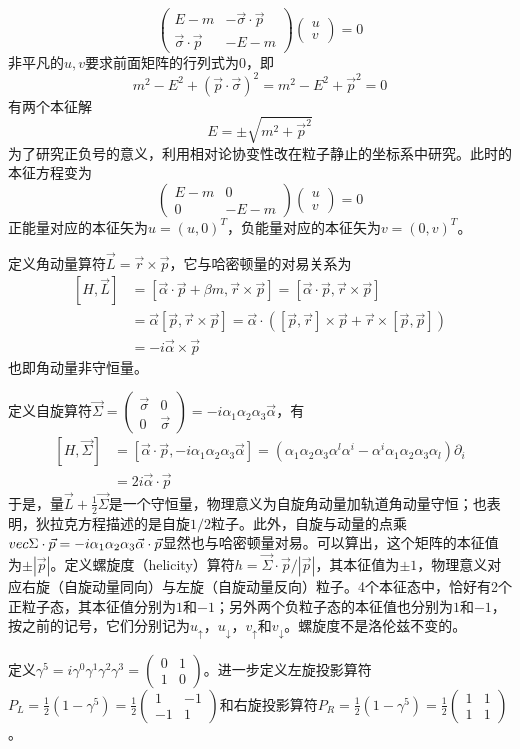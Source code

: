 \documentclass[a4paper,11pt]{ctexart}
\newcommand{\beq}{\begin{equation}}
\newcommand{\eeq}{\end{equation}}
\newcommand{\bea}{\begin{equation}\begin{aligned}}
\newcommand{\eea}{\end{aligned}\end{equation}}
\newcommand{\mt}[4]{\begin{pmatrix}#1 & #2 \\ #3 & #4 \end{pmatrix}}
\begin{document}
\beq
\begin{pmatrix}
E-m & -\vec{\sigma} \cdot \vec{p} \\
\vec{\sigma} \cdot \vec{p} & -E-m
\end{pmatrix}
\begin{pmatrix} u \\ v \end{pmatrix}
=0
\eeq
非平凡的$u,v$要求前面矩阵的行列式为0，即
\beq
m^2 - E^2 + \left( \vec{p} \cdot \vec{\sigma}\right)^2 = m^2 - E^2 + \vec{p}^2 = 0
\eeq
有两个本征解
\beq
E = \pm \sqrt{m^2 + \vec{p}^2}
\eeq
为了研究正负号的意义，利用相对论协变性改在粒子静止的坐标系中研究。此时的本征方程变为
\beq
\mt{E-m}{0}{0}{-E-m} \begin{pmatrix} u \\ v \end{pmatrix} = 0
\eeq
正能量对应的本征矢为$u = (u,0)^T$，负能量对应的本征矢为$v = (0,v)^T$。\par
定义角动量算符$\vec{L} = \vec{r} \times \vec{p}$，它与哈密顿量的对易关系为
\bea
[H,\vec{L}] &= [\vec{\alpha} \cdot \vec{p} + \beta m , \vec{r} \times \vec{p}] = [\vec{\alpha} \cdot \vec{p},\vec{r} \times \vec{p}] \\ &= \vec{\alpha} [\vec{p},\vec{r} \times \vec{p}] = \vec{\alpha} \cdot \left( [\vec{p} ,\vec{r}] \times \vec{p} + \vec{r} \times [\vec{p}, \vec{p}] \right) \\
&= -i \vec{\alpha} \times \vec{p}
\eea
也即角动量非守恒量。
\par
定义自旋算符$\vec{\Sigma} = \mt{\vec{\sigma}}{0}{0}{\vec{\sigma}} = -i \alpha_1 \alpha_2 \alpha_3 \vec{\alpha}$，有
\bea
[H,\vec{\Sigma}] &= [\vec{\alpha} \cdot \vec{p} , -i \alpha_1 \alpha_2 \alpha_3 \vec{\alpha}]  = \left( \alpha_1 \alpha_2 \alpha_3 \alpha^l \alpha^i - \alpha^i \alpha_1 \alpha_2 \alpha_3 \alpha_l \right) \partial_i \\
&=2i \vec{\alpha} \cdot \vec{p}
\eea
于是，量$\vec{L} + \frac{1}{2} \vec{\Sigma}$是一个守恒量，物理意义为自旋角动量加轨道角动量守恒；也表明，狄拉克方程描述的是自旋$1/2$粒子。此外，自旋与动量的点乘$\\vec{\Sigma} \cdot \vec{p} = -i \alpha_1 \alpha_2 \alpha_3 \vec{\alpha} \cdot \vec{p}$显然也与哈密顿量对易。可以算出，这个矩阵的本征值为$\pm |\vec{p}|$。定义螺旋度（helicity）算符$h = \vec{\Sigma}\cdot \vec{p} / | \vec{p} |$，其本征值为$\pm 1$，物理意义对应右旋（自旋动量同向）与左旋（自旋动量反向）粒子。4个本征态中，恰好有2个正粒子态，其本征值分别为$1$和$-1$；另外两个负粒子态的本征值也分别为$1$和$-1$，按之前的记号，它们分别记为$u_\uparrow$，$u_\downarrow$，$v_\uparrow$和$v_\downarrow$。螺旋度不是洛伦兹不变的。
\par
定义$\gamma^5 = i \gamma^0 \gamma^1 \gamma^2 \gamma^3 = \mt{0}{1}{1}{0}$。进一步定义左旋投影算符$P_L = \frac{1}{2} \left( 1 - \gamma^5 \right) = \frac{1}{2}\mt{1}{-1}{-1}{1}$和右旋投影算符$P_R = \frac{1}{2} \left( 1 - \gamma^5 \right) = \frac{1}{2} \mt{1}{1}{1}{1}$。
\end{document}
